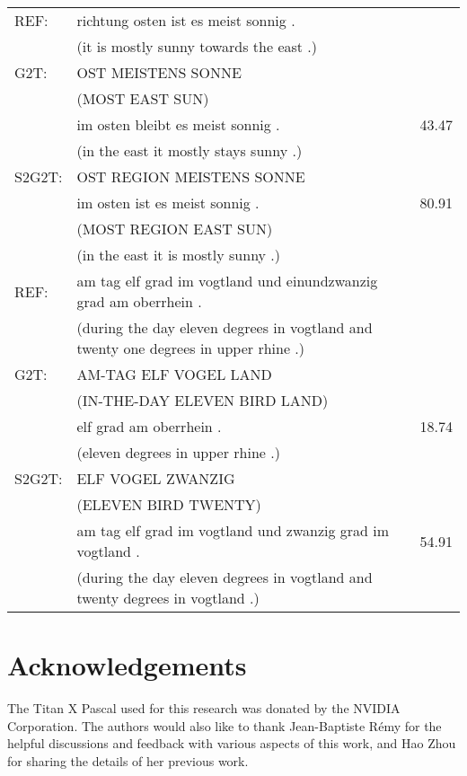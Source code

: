 \documentclass[11pt]{article}
\begin{document}
\begin{center}
{\begin{tabular}{ll|c}
 \midrule
 
 REF: & richtung osten ist es meist sonnig . & \\
     &\footnotesize (it is mostly sunny towards the east .) \\
 G2T: & OST MEISTENS SONNE &\\
      & \footnotesize (MOST EAST SUN) & \\
& im osten bleibt es meist sonnig . & 43.47 \\      
     & \footnotesize (in the east it mostly stays sunny .)& \\ 
     
 S2G2T: & OST REGION MEISTENS SONNE  & \\
 & im osten ist es meist sonnig . & 80.91 \\
  & \footnotesize (MOST REGION EAST SUN) &\\
  & \footnotesize (in the east it is mostly sunny .)& \\  
   \midrule
  
 REF: & am tag elf grad im vogtland und einundzwanzig grad am oberrhein . & \\
 &\footnotesize (during the day eleven degrees in vogtland and twenty one degrees in upper rhine .) \\
 G2T: & AM-TAG ELF VOGEL LAND & \\
 
   & \footnotesize (IN-THE-DAY ELEVEN BIRD LAND) & \\
& elf grad am oberrhein . & 18.74 \\   
  & \footnotesize (eleven degrees in upper rhine .)& \\
 S2G2T: & ELF VOGEL ZWANZIG & \\
  & \footnotesize (ELEVEN BIRD TWENTY) &\\
  & am tag elf grad im vogtland und zwanzig grad im vogtland . & 54.91 \\
  & \footnotesize (during the day eleven degrees in vogtland and twenty degrees in vogtland .)& \\
 
  \bottomrule
\end{tabular}} 
\label{table:compare}
\end{center}






\section*{Acknowledgements}
The Titan X Pascal used for this research was donated by the NVIDIA Corporation. The authors would also like to thank Jean-Baptiste Rémy for the helpful discussions and feedback with various aspects of this work, and Hao Zhou for sharing the details of her previous work.
\end{document}

